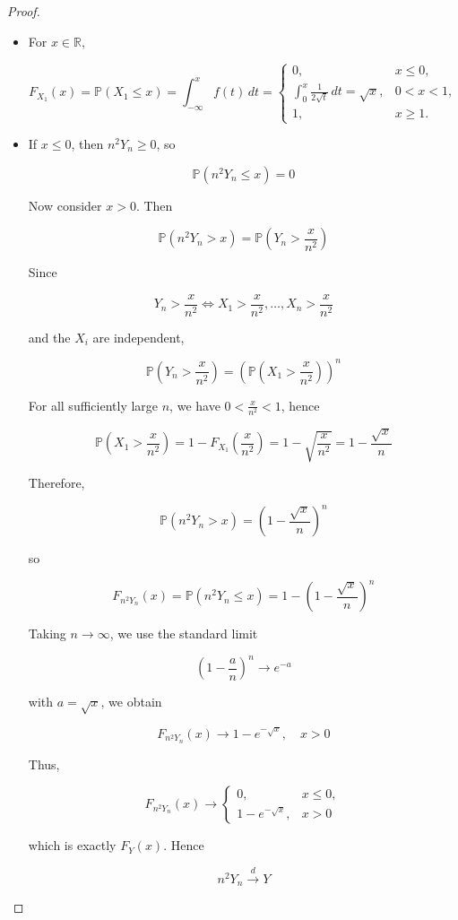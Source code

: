 \documentclass{qlnotes-export}
\begin{document}
\begin{proof}

\begin{itemize}
\item
  For \(x \in {\mathbb{R}}\),

  \[F_{X_{1}}(x) = {\mathbb{P}}(X_{1} \leq x) = \int_{- \infty}^{x}f(t)\, dt = \left\{ \begin{matrix}
  {0,} & {x \leq 0,} \\
  {\int_{0}^{x}\frac{1}{2\sqrt{t}}\, dt = \sqrt{x},} & {0 < x < 1,} \\
  {1,} & {x \geq 1.}
  \end{matrix} \right.\]
\item
  If \(x \leq 0\), then \(n^{2}Y_{n} \geq 0\), so

  \[{\mathbb{P}}(n^{2}Y_{n} \leq x) = 0\]

  Now consider \(x > 0\). Then

  \[{\mathbb{P}}(n^{2}Y_{n} > x) = {\mathbb{P}}\left( {Y_{n} > \frac{x}{n^{2}}} \right)\]

  Since

  \[Y_{n} > \frac{x}{n^{2}}\Leftrightarrow X_{1} > \frac{x}{n^{2}},\ldots,X_{n} > \frac{x}{n^{2}}\]

  and the \(X_{i}\) are independent,

  \[{\mathbb{P}}\left( {Y_{n} > \frac{x}{n^{2}}} \right) = \left( {{\mathbb{P}}\left( {X_{1} > \frac{x}{n^{2}}} \right)} \right)^{n}\]

  For all sufficiently large \(n\), we have \(0 < \frac{x}{n^{2}} < 1\), hence

  \[{\mathbb{P}}\left( {X_{1} > \frac{x}{n^{2}}} \right) = 1 - F_{X_{1}}\left( \frac{x}{n^{2}} \right) = 1 - \sqrt{\frac{x}{n^{2}}} = 1 - \frac{\sqrt{x}}{n}\]

  Therefore,

  \[{\mathbb{P}}(n^{2}Y_{n} > x) = \left( {1 - \frac{\sqrt{x}}{n}} \right)^{n}\]

  so

  \[F_{n^{2}Y_{n}}(x) = {\mathbb{P}}(n^{2}Y_{n} \leq x) = 1 - \left( {1 - \frac{\sqrt{x}}{n}} \right)^{n}\]

  Taking \(n\rightarrow\infty\), we use the standard limit

  \[\left( {1 - \frac{a}{n}} \right)^{n}\rightarrow e^{- a}\]

  with \(a = \sqrt{x}\), we obtain

  \[F_{n^{2}Y_{n}}(x)\rightarrow 1 - e^{- \sqrt{x}},\quad x > 0\]

  Thus,

  \[F_{n^{2}Y_{n}}(x)\rightarrow\left\{ \begin{matrix}
  {0,} & {x \leq 0,} \\
  {1 - e^{- \sqrt{x}},} & {x > 0}
  \end{matrix} \right.\]

  which is exactly \(F_{Y}(x)\). Hence

  \[n^{2}Y_{n}\overset{d}{\rightarrow}Y\]
\end{itemize}

\end{proof}
\end{document}
